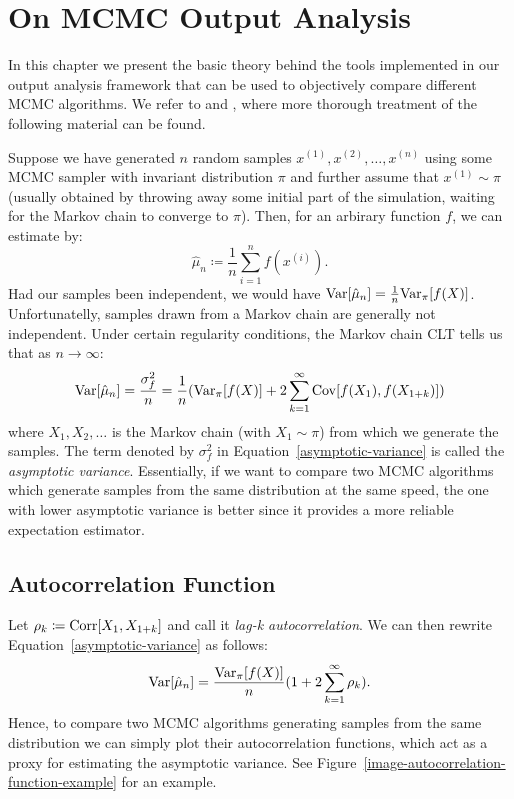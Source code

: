 \documentclass[report.tex]{subfiles}
\begin{document}
\chapter{On MCMC Output Analysis}
\label{mcmc-output-analysis}

In this chapter we present the basic theory behind the tools implemented in our
output analysis framework that can be used to objectively compare different
MCMC algorithms. We refer to
\citet[Chapter 1]{brooks2011handbook} and \citet[Chapter 5]{liu2008monte}, where
more thorough treatment of the following material can be found.

Suppose we have generated $n$ random samples $x^{(1)}, x^{(2)}, \dots, x^{(n)}$ using
some MCMC sampler with invariant distribution $\pi$ and further assume that
$x^{(1)} \sim \pi$ (usually obtained by throwing away some initial part of the
simulation, waiting for the Markov chain to converge to $\pi$).
Then, for an arbirary function $f$, we can estimate  by:
$$
\hat{\mu}_{n} \coloneqq \frac{1}{n} \sum_{i=1}^{n} f(x^{(i)}).
$$
Had our samples been independent, we would have
$\mathrm{Var}\!\left[{\hat{\mu}_{n}}\right] = \frac{1}{n} \mathrm{Var}_{{\pi}}\!\left[{f(X)}\right]$.
Unfortunatelly, samples drawn from a Markov chain are generally not independent.
Under certain regularity conditions, the Markov chain CLT tells us that as $n \to \infty$:
\begin{equation}
\label{asymptotic-variance}
\mathrm{Var}\!\left[{\hat{\mu}_{n}}\right] = \frac{\sigma_{f}^{2}}{n} = \frac{1}{n}(
  \mathrm{Var}_{{\pi}}\!\left[{f(X)}\right]
  + 2 \sum_{k=1}^{\infty} \mathrm{Cov}\!\left[{f(X_{1})}, {f(X_{1+k})}\right])
\end{equation}
where $X_{1}, X_{2}, \dots$ is the Markov chain (with $X_{1} \sim \pi$) from
which we generate the samples.
The term denoted by $\sigma_{f}^{2}$ in Equation~\ref{asymptotic-variance}
is called the \textit{asymptotic variance}.
Essentially, if we want to compare two MCMC algorithms which generate samples
from the same distribution at the same speed, the one with lower asymptotic variance
is better since it provides a more reliable expectation estimator.

\section{Autocorrelation Function}

Let $\rho_{k} \coloneqq \mathrm{Corr}\!\left[{X_{1}}, { X_{1+k}}\right]$ and call it \textit{lag-k autocorrelation}.
We can then rewrite Equation~\ref{asymptotic-variance}
as follows:
\begin{equation}
\label{asymptotic-variance-autocorrelation-time}
\mathrm{Var}\!\left[{\hat{\mu}_{n}}\right] = \frac{\mathrm{Var}_{{\pi}}\!\left[{f(X)}\right]}{n}(
1 + 2 \sum_{k=1}^{\infty} \rho_{k}).
\end{equation}
Hence, to compare two MCMC algorithms generating samples from the same distribution
we can simply plot their autocorrelation functions, which act as a proxy for estimating
the asymptotic variance.
See Figure~\ref{image-autocorrelation-function-example} for an example.
\end{document}
